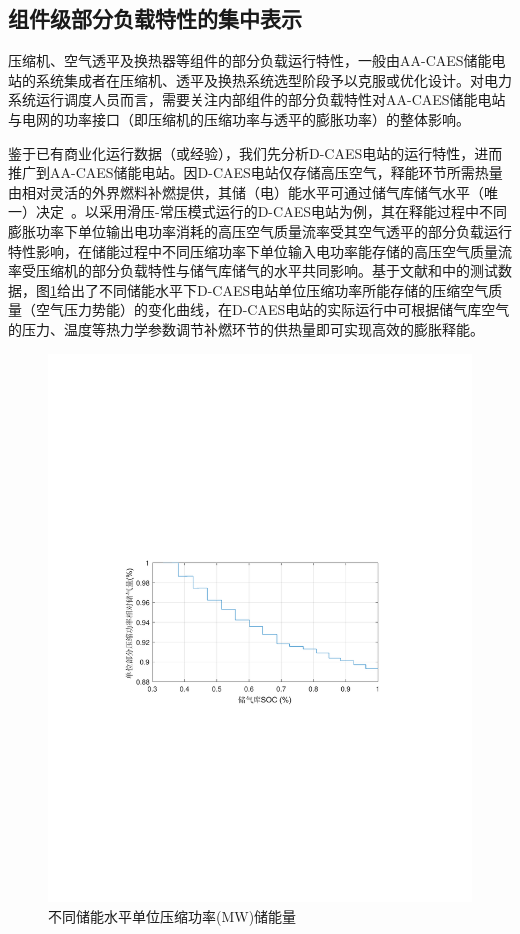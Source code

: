\subsection{组件级部分负载特性的集中表示}
压缩机、空气透平及换热器等组件的部分负载运行特性，一般由AA-CAES储能电站的系统集成者在压缩机、透平及换热系统选型阶段予以克服或优化设计。对电力系统运行调度人员而言，需要关注内部组件的部分负载特性对AA-CAES储能电站与电网的功率接口（即压缩机的压缩功率与透平的膨胀功率）的整体影响。

鉴于已有商业化运行数据（或经验），我们先分析D-CAES电站的运行特性，进而推广到AA-CAES储能电站。因D-CAES电站仅存储高压空气，释能环节所需热量由相对灵活的外界燃料补燃提供，其储（电）能水平可通过储气库储气水平（唯一）决定~\cite{CAES-Review-18-Rui-operation}。以采用滑压-常压模式运行的D-CAES电站为例，其在释能过程中不同膨胀功率下单位输出电功率消耗的高压空气质量流率受其空气透平的部分负载运行特性影响，在储能过程中不同压缩功率下单位输入电功率能存储的高压空气质量流率受压缩机的部分负载特性与储气库储气的水平共同影响。基于文献和中的测试数据，图\ref{fig:Compression-SOC-Part-Load}给出了不同储能水平下D-CAES电站单位压缩功率所能存储的压缩空气质量（空气压力势能）的变化曲线，在D-CAES电站的实际运行中可根据储气库空气的压力、温度等热力学参数调节补燃环节的供热量即可实现高效的膨胀释能。

\begin{figure}[H] %
  \centering
  \includegraphics[scale=0.80]{figures/Chap1-8-Compression-SOC-Part-Load.pdf}
  \caption{不同储能水平单位压缩功率(MW)储能量}
  \label{fig:Compression-SOC-Part-Load}
\end{figure}


